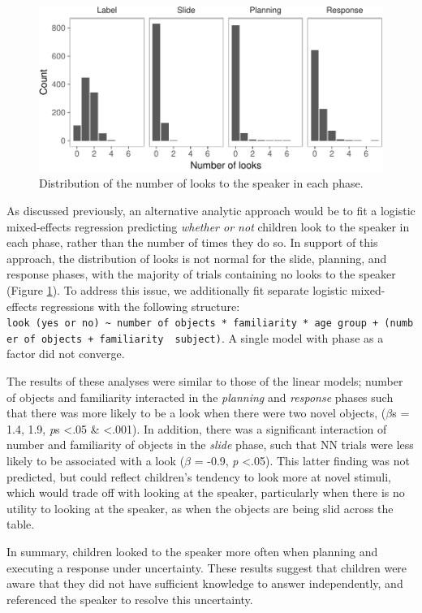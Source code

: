 \documentclass[english,man]{apa6}
\theoremstyle{definition}
\theoremstyle{definition}
\theoremstyle{definition}
\theoremstyle{remark}
\begin{document}
\begin{figure}[htbp]
\centering
\includegraphics{figs/histe1-1.pdf}
\caption{\label{fig:histe1}Distribution of the number of looks to the
speaker in each phase.}
\end{figure}

As discussed previously, an alternative analytic approach would be to
fit a logistic mixed-effects regression predicting \emph{whether or not}
children look to the speaker in each phase, rather than the number of
times they do so. In support of this approach, the distribution of looks
is not normal for the slide, planning, and response phases, with the
majority of trials containing no looks to the speaker (Figure
\ref{fig:histe1}). To address this issue, we additionally fit separate
logistic mixed-effects regressions with the following structure:
\texttt{look\ (yes\ or\ no)\ \textasciitilde{}\ number\ of\ objects\ *\ familiarity\ *\ age\ group\ +\ (number\ of\ objects\ +\ familiarity\ \textbar{}\ subject)}.
A single model with phase as a factor did not converge.

The results of these analyses were similar to those of the linear
models; number of objects and familiarity interacted in the
\emph{planning} and \emph{response} phases such that there was more
likely to be a look when there were two novel objects, (\(\beta\)s =
1.4, 1.9, \emph{p}s \textless{}.05 \& \textless{}.001). In addition,
there was a significant interaction of number and familiarity of objects
in the \emph{slide} phase, such that NN trials were less likely to be
associated with a look (\(\beta\) = -0.9, \emph{p} \textless{}.05). This
latter finding was not predicted, but could reflect children's tendency
to look more at novel stimuli, which would trade off with looking at the
speaker, particularly when there is no utility to looking at the
speaker, as when the objects are being slid across the table.

In summary, children looked to the speaker more often when planning and
executing a response under uncertainty. These results suggest that
children were aware that they did not have sufficient knowledge to
answer independently, and referenced the speaker to resolve this
uncertainty.
\end{document}
